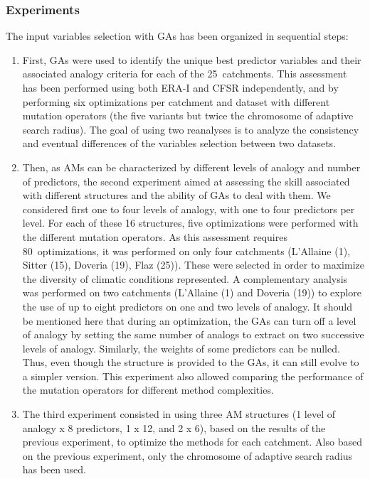 \documentclass[draft]{agujournal2019}
\begin{document}
\subsubsection{Experiments}
\label{experiments}

The input variables selection with GAs has been organized in sequential steps:

\begin{enumerate}
	\item First, GAs were used to identify the unique best predictor variables and their associated analogy criteria for each of the 25~catchments. This assessment has been performed using both ERA-I and CFSR independently, and by performing six optimizations per catchment and dataset with different mutation operators (the five variants but twice the chromosome of adaptive search radius). The goal of using two reanalyses is to analyze the consistency and eventual differences of the variables selection between two datasets.
	\item Then, as AMs can be characterized by different levels of analogy and number of predictors, the second experiment aimed at assessing the skill associated with different structures and the ability of GAs to deal with them. We considered first one to four levels of analogy, with one to four predictors per level. For each of these 16 structures, five optimizations were performed with the different mutation operators. As this assessment requires 80~optimizations, it was performed on only four catchments (L'Allaine (1), Sitter (15), Doveria (19), Flaz (25)). These were selected in order to maximize the diversity of climatic conditions represented. A complementary analysis was performed on two catchments (L'Allaine (1) and Doveria (19)) to explore the use of up to eight predictors on one and two levels of analogy. It should be mentioned here that during an optimization, the GAs can turn off a level of analogy by setting the same number of analogs to extract on two successive levels of analogy. Similarly, the weights of some predictors can be nulled. Thus, even though the structure is provided to the GAs, it can still evolve to a simpler version. This experiment also allowed comparing the performance of the mutation operators for different method complexities.
	\item The third experiment consisted in using three AM structures (1 level of analogy x 8 predictors, 1 x 12, and 2 x 6), based on the results of the previous experiment, to optimize the methods for each catchment. Also based on the previous experiment, only the chromosome of adaptive search radius has been used.

\end{enumerate}
\end{document}
